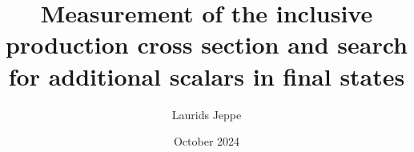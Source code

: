 \documentclass[12pt]{report}
\title{Measurement of the inclusive \ttbar production cross section and search for additional scalars in \ttbar final states
}
\author{Laurids Jeppe}
\date{October 2024}
\begin{document}
\maketitle

\newpage
\tableofcontents
\newpage















\begin{appendix}
\thispagestyle{empty}


\end{appendix}
\end{document}
